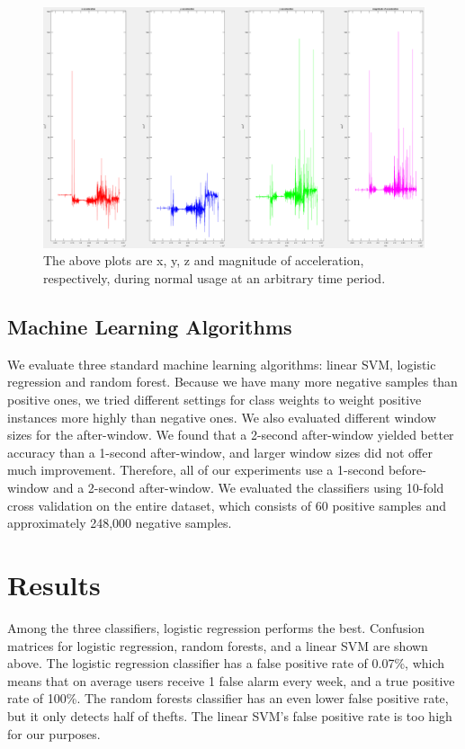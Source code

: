 \documentclass{soups}
\begin{document}
\begin{figure}[t]
\includegraphics[width=1.0\columnwidth]{neg_acc_separated.png}
\caption{The above plots are x, y, z and magnitude of acceleration, respectively, during normal usage at an arbitrary time period.}
\end{figure}



\subsection{Machine Learning Algorithms}
We evaluate three standard machine learning algorithms: linear SVM, logistic regression and random forest.
Because we have many more negative samples than positive ones, we tried different settings for class weights to weight positive instances more highly than negative ones.
We also evaluated different window sizes for the after-window.
We found that a 2-second after-window yielded better accuracy than a 1-second after-window, and larger window sizes did not offer much improvement.
Therefore, all of our experiments use a 1-second before-window and a 2-second after-window.
We evaluated the classifiers using 10-fold cross validation on the entire dataset, which consists of 60 positive samples and approximately 248,000 negative samples. 



\section{Results}
Among the three classifiers, logistic regression performs the best.
Confusion matrices for logistic regression, random forests, and a linear SVM
are shown above.
The logistic regression classifier has a false positive rate of 0.07\%, which means that on average users receive 1 false alarm every week, and a true positive rate of 100\%.
The random forests classifier has an even lower false positive rate,
but it only detects half of thefts.
The linear SVM's false positive rate is too high for our purposes.
\end{document}
